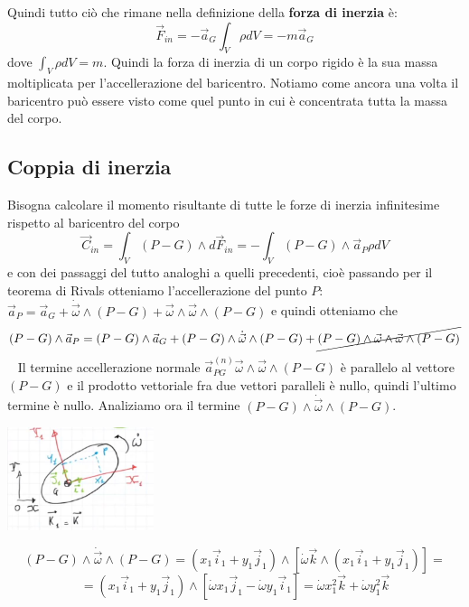 \newline
Quindi tutto ciò che rimane nella definizione della \textbf{forza di inerzia} è:
\[
    \vec{F}_{in} = - \vec{a}_G \int_V \rho dV = - m \vec{a}_G
\]
dove $\int_V \rho dV = m$.\newline
\newline
Quindi la forza di inerzia di un corpo rigido è la sua massa moltiplicata per l'accellerazione del baricentro. Notiamo come ancora una volta il baricentro può essere visto come quel punto in cui è concentrata tutta la massa del corpo.
\subsection*{Coppia di inerzia}
Bisogna calcolare il momento risultante di tutte le forze di inerzia infinitesime rispetto al baricentro del corpo
\[
    \vec{C}_{in} = \int_V (P-G) \land d \vec{F}_{in} =  - \int_V (P-G) \land \vec{a}_P \rho dV
\]
e con dei passaggi del tutto analoghi a quelli precedenti, cioè passando per il teorema di Rivals otteniamo l'accellerazione del punto $P$: $\vec{a}_P = \vec{a}_G + \dot{\vec{\omega}} \land (P-G) + \vec{\omega} \land \vec{\omega} \land (P-G)$ e quindi otteniamo che
\[
    (P-G) \land \vec{a}_P = (P-G) \land \vec{a}_G + (P-G) \land \dot{\vec{\omega}} \land (P-G) + \cancel{(P-G) \land \vec{\omega} \land \vec{\omega} \land (P-G)}
\]
\ \newline
Il termine accellerazione normale $ \vec{a}_{PG}^{(n)} \vec{\omega} \land \vec{\omega} \land (P-G)$ è parallelo al vettore $(P-G)$ e il prodotto vettoriale fra due vettori paralleli è nullo, quindi l'ultimo termine è nullo.\newline
\newline
Analiziamo ora il termine $(P-G) \land \dot{\vec{\omega}} \land (P-G)$.
\begin{center}
    \includegraphics[height=3cm]{../lezione9/img3.JPG}
\end{center}
\[
    (P-G) \land \dot{\vec{\omega}} \land (P-G) = (x_1 \vec{i}_1 + y_1 \vec{j}_1) \land \left[ \dot{\omega} \vec{k} \land (x_1 \vec{i}_1 + y_1 \vec{j}_1) \right] =
\]
\[
    =  (x_1 \vec{i}_1 + y_1 \vec{j}_1) \land \left[ \dot{\omega} x_1 \vec{j}_1 - \dot{\omega} y_1 \vec{i}_1 \right] = \dot{\omega} x_1^2 \vec{k} + \dot{\omega} y_1^2 \vec{k}
\]
